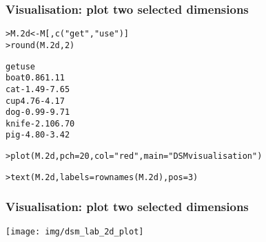 \begin{frame}[fragile]
  \frametitle{Visualisation: plot two selected dimensions}

\ungap
\begin{alltt}\small
> M.2d <- M[, c("get", "use")]
> round(M.2d, 2) \begin{Rout}
          get   use
  boat   0.86  1.11
  cat   -1.49 -7.65
  cup    4.76 -4.17
  dog   -0.99 -9.71
  knife -2.10  6.70
  pig   -4.80 -3.42 \end{Rout}

> plot(M.2d, pch=20, col="red", main="DSM visualisation")

> text(M.2d, labels=rownames(M.2d), pos=3)
\end{alltt}
\end{frame}

\begin{frame}
  \frametitle{Visualisation: plot two selected dimensions}

  \ungap[2]
  \begin{center}
    \texttt{[image: img/dsm\_lab\_2d\_plot]}
  \end{center}
\end{frame}

